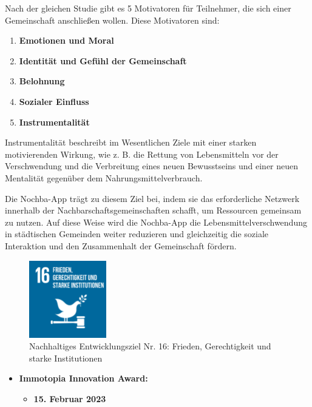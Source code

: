 Nach der gleichen Studie gibt es 5 Motivatoren für Teilnehmer, die sich einer Gemeinschaft anschließen wollen. Diese Motivatoren sind:

\begin{enumerate}
    \item \textbf{Emotionen und Moral}
    \item \textbf{Identität und Gefühl der Gemeinschaft}
    \item \textbf{Belohnung}
    \item \textbf{Sozialer Einfluss}
    \item \textbf{Instrumentalität}
\end{enumerate}

Instrumentalität beschreibt im Wesentlichen Ziele mit einer starken motivierenden Wirkung, wie z. B. die Rettung von Lebensmitteln vor der Verschwendung und die Verbreitung eines neuen Bewusstseins und einer neuen Mentalität gegenüber dem Nahrungsmittelverbrauch.

Die Nochba-App trägt zu diesem Ziel bei, indem sie das erforderliche Netzwerk innerhalb der Nachbarschaftsgemeinschaften schafft, um Ressourcen gemeinsam zu nutzen. Auf diese Weise wird die Nochba-App die Lebensmittelverschwendung in städtischen Gemeinden weiter reduzieren und gleichzeitig die soziale Interaktion und den Zusammenhalt der Gemeinschaft fördern.

\begin{figure}[H]
    \centering
    \includegraphics[width=0.3\textwidth]{pics/SDG-16.png}
    \caption{Nachhaltiges Entwicklungsziel Nr. 16: Frieden, Gerechtigkeit und starke Institutionen}
    \label{fig:SDG16}
\end{figure}

\begin{itemize}
    \item \textbf{Immotopia Innovation Award:}
          \begin{itemize}
              \item \textbf{15. Februar 2023}
          \end{itemize}
\end{itemize}

